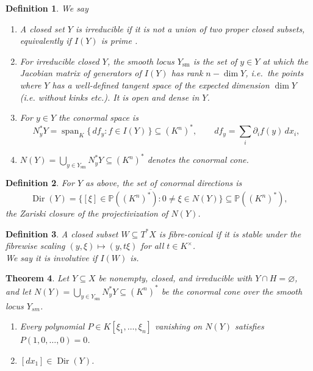 \documentclass[pdflatex,sn-mathphys-num]{sn-jnl}
\numberwithin{equation}{section}
\theoremstyle{thmstyleone}
\newtheorem{theorem}{Theorem}[section]
\newtheorem{definition}[theorem]{Definition}
\theoremstyle{thmstyletwo}
\begin{document}
\begin{definition}\label{def:conormal}
We say
\begin{enumerate}[label=(\alph*)]
\item A closed set $Y$ is \emph{irreducible} if it is not a union of two proper closed subsets, equivalently if $I(Y)$ is prime \cite[Cor I.1.4]{hartshorne}. 
\item For irreducible closed $Y$, the \emph{smooth locus} $Y_{\mathrm{sm}}$ is the set of $y\in Y$ at which the Jacobian matrix of generators of $I(Y)$ has rank $n-\dim Y$, i.e.\ the points where $Y$ has a well-defined tangent space of the expected dimension $\dim Y$ (i.e. without kinks etc.). It is open and dense in $Y$. \cite[Ch. I.5]{hartshorne} 
\item For $y\in Y$ the \emph{conormal space} is
\[N^*_yY=\operatorname{span}_K\{\,df_y : f\in I(Y)\,\}\subseteq(K^n)^*,\qquad
 df_y=\textstyle\sum_i\partial_if(y)\,dx_i,\]
 \item $N(Y)=\bigcup_{y\in Y_{\mathrm{sm}}}N^*_yY\subseteq (K^n)^*$ denotes the \emph{conormal
cone}. 
\end{enumerate}
\end{definition}


\begin{definition}\label{def:dir}
For $Y$ as above, the set of \emph{conormal directions} is
\[ \operatorname{Dir}(Y)=\overline{\{[\xi]\in\mathbb P((K^n)^*): 0\neq\xi\in N(Y)\}}
 \subseteq\mathbb P((K^n)^*),\]
the Zariski closure of the projectivization of $N(Y)$.
\end{definition}

\begin{definition}\label{def:fibre-can}
A closed subset $W\subseteq T^*X$ is \emph{fibre-conical} if it is stable under the
fibrewise scaling $(y,\xi)\mapsto(y,t\xi)$ for all $t\in K^\times$.\\
We say it is \emph{involutive} if $I(W)$ is.
\end{definition}

\begin{theorem}\label{thm:asymptotic-conormal-formal}
Let $Y\subseteq X$ be nonempty, closed, and irreducible with $Y\cap H=\varnothing$, and let
$N(Y)=\bigcup_{y\in Y_{\mathrm{sm}}}N^*_yY\subseteq (K^n)^*$ be the conormal cone over the smooth locus $Y_{sm}$.
\begin{enumerate}[label=(\roman*)]
\item Every polynomial $P\in K[\xi_1,\dots,\xi_n]$ vanishing on $N(Y)$ satisfies $P(1,0,\dots,0)=0$.
\item $[dx_1]\in\operatorname{Dir}(Y)$.
\end{enumerate}
\end{theorem}
\end{document}
